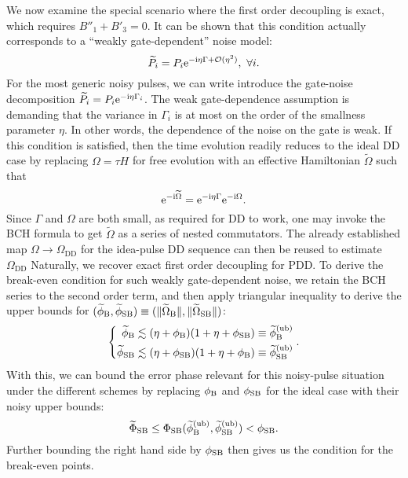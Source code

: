\documentclass[pra,reprint,superscriptaddress]{revtex4-2}
\newcommand{\wtP}{\widetilde{P}}
\newcommand{\wtO}{\widetilde{\Omega}}
\newcommand{\rDD}{\mathrm{DD}}
\begin{document}
We now examine the special scenario where the first order decoupling is exact, which requires $B''_1+B'_3=0$. It can be shown that this condition actually corresponds to a ``weakly gate-dependent'' noise model:
\begin{equation}\label{eq:gateindep1}
 \wtP_i = P_i \upe^{-\upi \eta \Gamma + \cO(\eta^2)},\ \forall i.
\end{equation}
For the most generic noisy pulses, we can write introduce the gate-noise decomposition $\wtP_i = P_i \upe^{-\upi \eta \Gamma_i}$. The weak gate-dependence assumption is demanding that the variance in $\Gamma_i$  
is at most on the order of the smallness parameter $\eta$.
In other words, the dependence of the noise on the gate is weak. If this condition is 
 satisfied, then the time evolution readily reduces to the ideal DD case by replacing $\Omega=\tau H$ for free evolution with an effective Hamiltonian $\wtO$ such that
\begin{equation}
\upe^{-\upi \wtO}=\upe^{-\upi \eta \Gamma}\upe^{-\upi \Omega}.
\end{equation}
Since $\Gamma$ and $\Omega$ are both small, as required for DD to work,
one may invoke the BCH formula to get $\wtO$ as a series of nested commutators. 
The already established map $\Omega\to \Omega_{\rDD}$ for the idea-pulse DD sequence can then be reused to estimate $\Omega_{\rDD}$
Naturally, we recover exact first order decoupling for PDD. To derive the break-even condition for such weakly gate-dependent noise, 
we retain the BCH series to the second order term, and then apply triangular inequality to derive the upper bounds for $(\widetilde\phi_\rB,\widetilde{\phi}_\rSB) \equiv( \norm{\wtO_\rB}, \norm{\wtO_\rSB})$:
\begin{equation}\label{eq:comb-bound}
\left\{
\begin{aligned}
 \widetilde\phi_{\mathrm{B}} &\lesssim (\eta + \phi_{\mathrm{B}})(1+\eta + \phi_{\mathrm{SB}}) \equiv \widetilde\phi_{\mathrm{B}}^{(\mathrm{ub})}\\
 \widetilde\phi_{\mathrm{SB}} &\lesssim (\eta + \phi_{\mathrm{SB}}) (1+\eta + \phi_{\mathrm{B}})\equiv \widetilde\phi_{\mathrm{SB}}^{(\mathrm{ub})}
\end{aligned}
\right..
\end{equation}
With this, we can bound the error phase relevant for this noisy-pulse situation under the different schemes by replacing $\phi_{\mathrm{B}}$ and $\phi_{\mathrm{SB}}$ for the ideal case with their noisy upper bounds: 
\begin{equation}
 \widetilde\Phi_{\mathrm{SB}} \le \Phi_{\mathrm{SB}}(\widetilde\phi_{\mathrm{B}}^{(\mathrm{ub})}  ,\widetilde\phi_{\mathrm{SB}}^{(\mathrm{ub})} ) < \phi_{\mathrm{SB}}.
\end{equation}
Further bounding the right hand side by $\phi_{\mathrm{SB}}$ then gives us the condition for the break-even points.
\end{document}
